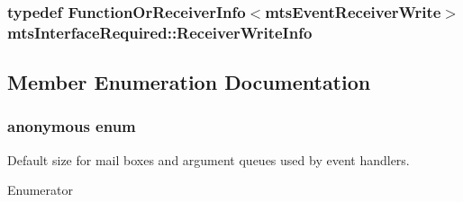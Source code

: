 \hypertarget{classmts_interface_required_a66d230e43ed3c2bb07f0593a997f06cc}{
\subsubsection[{Receiver\-Write\-Info}]{\setlength{\rightskip}{0pt plus 5cm}typedef {\bf Function\-Or\-Receiver\-Info}$<${\bf mts\-Event\-Receiver\-Write}$>$ {\bf mts\-Interface\-Required\-::\-Receiver\-Write\-Info}}}\label{classmts_interface_required_a66d230e43ed3c2bb07f0593a997f06cc}


\subsection{Member Enumeration Documentation}
\hypertarget{classmts_interface_required_afd977b8e5e4045ee10a68ff31e16a852}{\subsubsection[{anonymous enum}]{\setlength{\rightskip}{0pt plus 5cm}anonymous enum}}\label{classmts_interface_required_afd977b8e5e4045ee10a68ff31e16a852}
Default size for mail boxes and argument queues used by event handlers. \begin{Desc}
\item[Enumerator]\par
\begin{description}
\item[{\em 
\hypertarget{classmts_interface_required_afd977b8e5e4045ee10a68ff31e16a852a8b550bffbc9fcc1c50e42b45d36eaaec}{D\-E\-F\-A\-U\-L\-T\-\_\-\-M\-A\-I\-L\-\_\-\-B\-O\-X\-\_\-\-A\-N\-D\-\_\-\-A\-R\-G\-U\-M\-E\-N\-T\-\_\-\-Q\-U\-E\-U\-E\-S\-\_\-\-S\-I\-Z\-E}\label{classmts_interface_required_afd977b8e5e4045ee10a68ff31e16a852a8b550bffbc9fcc1c50e42b45d36eaaec}
}]\end{description}
\end{Desc}


